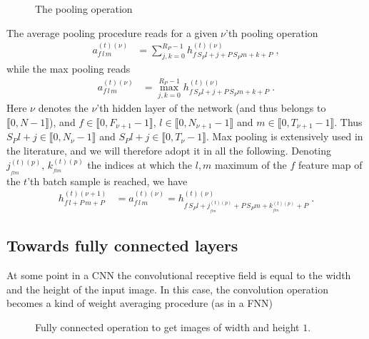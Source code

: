 \begin{figure}[H]
\begin{center}
\caption{The pooling operation}
\end{center}
\end{figure}

The average pooling procedure reads for a given $\nu$'th pooling operation
\begin{align}
a_{f\,l\,m}^{(t)(\nu)}&=\sum^{R_P-1}_{j,k=0} h_{f\,S_P l+j+P\,S_Pm+k+P}^{(t)(\nu)}\;,
\end{align}
while the max pooling reads
\begin{align}
a_{f\,l\,m}^{(t)(\nu)}&=\max^{R_P-1}_{j,k=0} h_{f\,S_P l+j+P\,S_Pm+k+P}^{(t)(\nu)}\;.
\end{align}
Here $\nu$ denotes the $\nu$'th hidden layer of the network (and thus belongs to $\llbracket0,N-1 \rrbracket$), and $f\in\llbracket0,F_{\nu+1}-1\rrbracket$, $l\in\llbracket0,N_{\nu+1}-1 \rrbracket$ and $m\in\llbracket0,T_{\nu+1}-1 \rrbracket$. Thus $S_Pl+j\in\llbracket0,N_\nu-1 \rrbracket$ and $S_Pl+j\in\llbracket0,T_\nu-1 \rrbracket$. Max pooling is extensively used in the literature, and we will therefore adopt it in all the following. Denoting $j^{(t)(p)}_{_{flm}},\,k^{(t)(p)}_{_{flm}}$ the indices at which the $l,m$ maximum of the $f$ feature map of the $t$'th batch sample is reached, we have
\begin{align}
h_{f\,l+P\,m+P}^{(t)(\nu+1)}&=a_{f\,l\,m}^{(t)(\nu)}=
%
h^{(t)(\nu)}_{f\,S_P l+j^{(t)(p)}_{_{flm}}+P\,S_Pm+k^{(t)(p)}_{_{flm}}+P}\;.
\end{align}

\subsection{Towards fully connected layers}

At some point in a CNN the convolutional receptive field is equal to the width and the height of the input image. In this case, the convolution operation becomes a kind of weight averaging procedure (as in a FNN)


\begin{figure}[H]
\begin{center}
\caption{Fully connected operation to get images of width and height $1$.}
\end{center}
\end{figure}


